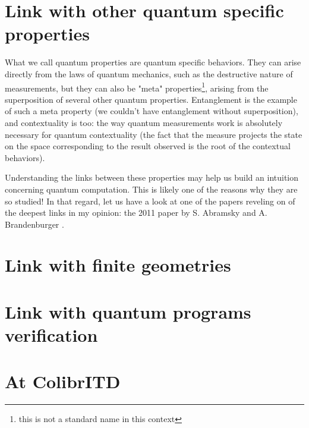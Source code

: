\documentclass{article}
\begin{document}
\section{Link with other quantum specific properties}
\label{sec:link_with_other_quantum_specific_properties}

What we call quantum properties are quantum specific behaviors. They can arise
directly from the laws of quantum mechanics, such as the destructive nature of
measurements, but they can also be "meta" properties\footnote{this is not a
standard name in this context}, arising from the superposition of several other
quantum properties. Entanglement is the example of such a meta property
(we couldn't have entanglement without superposition), and contextuality is too:
the way quantum measurements work is absolutely necessary for quantum
contextuality (the fact that the measure projects the state on the space
corresponding to the result observed is the root of the contextual behaviors).

Understanding the links between these properties may help us build an intuition
concerning quantum computation. This is likely one of the reasons why they are
so studied! In that regard, let us have a look at one of the papers reveling on
of the deepest links in my opinion: the 2011 paper by S. Abramsky and A.
Brandenburger  \cite{AB11}.

\section{Link with finite geometries}
\label{sec:link_with_finite_geometries}

\section{Link with quantum programs verification}
\label{sec:link_with_quantum_programs_verification}

\section*{At ColibrITD}



\end{document}
